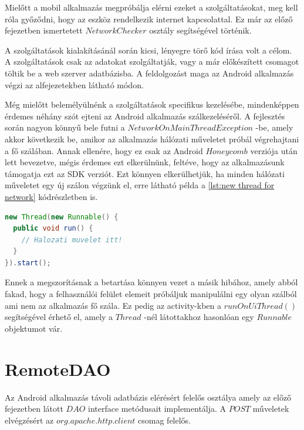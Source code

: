 \documentclass[12pt]{report}
\theoremstyle{definition}
\begin{document}
	Mielőtt a mobil alkalmazás megpróbálja elérni ezeket a szolgáltatásokat, meg kell róla győződni, hogy az eszköz rendelkezik internet kapcsolattal. Ez már az előző fejezetben ismertetett $NetworkChecker$ osztály segítségével történik.
	
	A szolgáltatások kialakításánál során kicsi, lényegre törő kód írása volt a célom. A szolgáltatások csak az adatokat szolgáltatják, vagy a már előkészített csomagot töltik be a web szerver adatbázisba. A feldolgozást maga az Android alkalmazás végzi az alfejezetekben látható módon.
	
	Még mielőtt belemélyülnénk a szolgáltatások specifikus kezelésébe, mindenképpen érdemes néhány szót ejteni az Android alkalmazás szálkezeléséről. A fejlesztés során nagyon könnyű bele futni a $NetworkOnMainThreadException$ -be, amely akkor következik be, amikor az alkalmazás hálózati műveletet próbál végrehajtani a fő szálában. Annak ellenére, hogy ez csak az Android $Honeycomb$ verziója után lett bevezetve, mégis érdemes ezt elkerülnünk, feltéve, hogy az alkalmazásunk támogatja ezt az SDK verziót. Ezt könnyen elkerülhetjük, ha minden hálózati műveletet egy új szálon végzünk el, erre látható példa a \ref{lst:new thread for network} kódrészletben is.
	
	\noindent\begin{minipage}{\linewidth}
		\begin{lstlisting}[language=java,label={lst:new thread for network}, caption={Új szál létrehozásra}]
new Thread(new Runnable() {
  public void run() {
    // Halozati muvelet itt!
  }
}).start();
		\end{lstlisting}
	\end{minipage}
	
	Ennek a megszorításnak a betartása könnyen vezet a másik hibához, amely abból fakad, hogy a felhasználói felület elemeit próbáljuk manipulálni egy olyan szálból ami nem az alkalmazás fő szála. Ez pedig az activity-kben a  $runOnUiThread\left(\right)$ segítségével érhető el, amely a $Thread$ -nél látottakhoz hasonlóan egy $Runnable$ objektumot vár.
	
	\section{RemoteDAO}
	Az Android alkalmazás távoli adatbázis elérésért felelős osztálya amely az előző fejezetben látott $DAO$ interface metódusait implementálja. A $POST$ műveletek elvégzésért az $org.apache.http.client$ csomag felelős.
	
\end{document}
